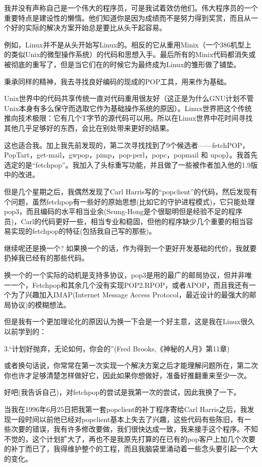 \documentclass[a4paper,12pt,UTF8,twoside]{ctexbook}
\begin{document}
我并没有声称自己是一个伟大的程序员，可是我试着效仿他们。伟大程序员的一个重要特点是建设性的懒惰。他们知道你是因为成绩而不是努力得到奖赏，而且从一个好的实际的解决方案开始总是要比从头干起容易。


例如，Linux并不是从头开始写Linux的。相反的它从重用Minix（一个386机型上的类似Unix的微型操作系统）的代码和思想入手。最后所有的Minix代码都消失或被彻底的重写了，但是当它们在的时候它为最终成为Linux的雏形做了铺垫。


秉承同样的精神，我去寻找良好编码的现成的POP工具，用来作为基础。


Unix世界中的代码共享传统一直对代码重用很友好（这正是为什么GNU计划不管Unix本身有多么保守而选取它作为基础操作系统的原因）。Linux世界把这个传统推向技术极限：它有几个T字节的源代码可以用。所以在Linux世界中花时间寻找其他几乎足够好的东西，会比在别处带来更好的结果。


这也适合我。加上我先前发现的，第二次寻找找到了9个候选者——fetchPOP，PopTart，get-mail，gwpop，pimp，pop-perl，popc，popmail 和 upop）。我首先选定的是“fetchpop”。我加入了头标重写功能，并且做了一些被作者加入他的1.9版中的改进。


但是几个星期之后，我偶然发现了Carl Harris写的“popclient”的代码，然后发现有个问题，虽然fetchpop有一些好的原始思想(比如它的守护进程模式)，它只能处理pop3，而且编码的水平相当业余(Seung-Hong是个很聪明但是经验不足的程序员)，Carl的代码更好一些，相当专业和稳固，但他的程序缺少几个重要的相当容易实现的fetchpop的特征(包括我自己写的那些)。


继续呢还是换一个? 如果换一个的话，作为得到一个更好开发基础的代价，我就要扔掉我已经有的那些代码。


换一个的一个实际的动机是支持多协议，pop3是用的最广的邮局协议，但并非唯一一个，Fetchpop和其余几个没有实现POP2.RPOP，或者APOP，而且我还有一个为了兴趣加入IMAP(Internet Message Access Protocol，最近设计的最强大的邮局协议)的模糊想法。


但是我有一个更加理论化的原因认为换一下会是一个好主意，这是我在Linux很久以前学到的：

3.“计划好抛弃，无论如何，你会的”(Fred Brooks,《神秘的人月》第11章)


或者换句话说，你常常在第一次实现一个解决方案之后才能理解问题所在，第二次你也许才足够清楚怎样做好它，因此如果你想做好，准备好推翻重来至少一次。


好吧(我告诉自己)，对fetchpop的尝试是我第一次的尝试，因此我换了一下。


当我在1996年6月25日把我第一套popclient的补丁程序寄给Carl Harris之后，我发现一段时间以前他已经对popclient基本上失去了兴趣，这些代码有些陈旧，有一些次要的错误，我有许多修改要做，我们很快达成一致，我来接手这个程序。不知不觉的，这个计划扩大了，再也不是我原先打算的在已有的pop客户上加几个次要的补丁而已了，我得维护整个的工程，而且我脑袋里涌动着一些念头要引起一个大的变化。
\end{document}
